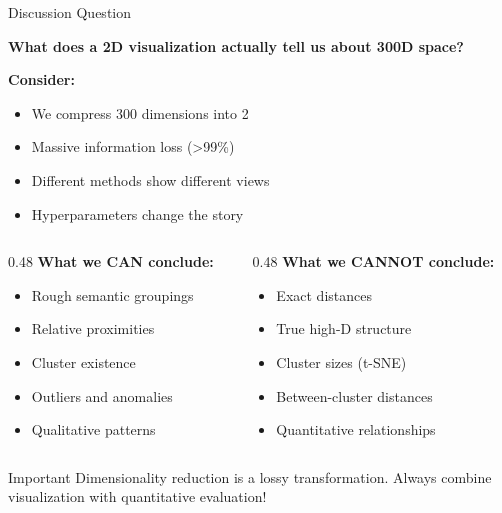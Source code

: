 \documentclass[aspectratio=169]{beamer}
\begin{document}
\begin{frame}[shrink=10]{Discussion Question 💬}
\begin{center}
\Large
\textbf{What does a 2D visualization actually tell us about 300D space?}
\end{center}

\vspace{1em}

\textbf{Consider:}
\begin{itemize}\setlength{\itemsep}{0pt}
    \item We compress 300 dimensions into 2
    \item Massive information loss (>99\%)
    \item Different methods show different views
    \item Hyperparameters change the story
\end{itemize}

\vspace{1em}

\begin{columns}[T]
\begin{column}{0.48\textwidth}
\textbf{What we CAN conclude:}
\begin{itemize}\setlength{\itemsep}{0pt}
    \item Rough semantic groupings
    \item Relative proximities
    \item Cluster existence
    \item Outliers and anomalies
    \item Qualitative patterns
\end{itemize}
\end{column}

\begin{column}{0.48\textwidth}
\textbf{What we CANNOT conclude:}
\begin{itemize}\setlength{\itemsep}{0pt}
    \item Exact distances
    \item True high-D structure
    \item Cluster sizes (t-SNE)
    \item Between-cluster distances
    \item Quantitative relationships
\end{itemize}
\end{column}
\end{columns}

\vspace{1em}

\begin{alertblock}{Important}
Dimensionality reduction is a \alert{lossy transformation}. Always combine visualization with quantitative evaluation!
\end{alertblock}
\end{frame}
\end{document}
